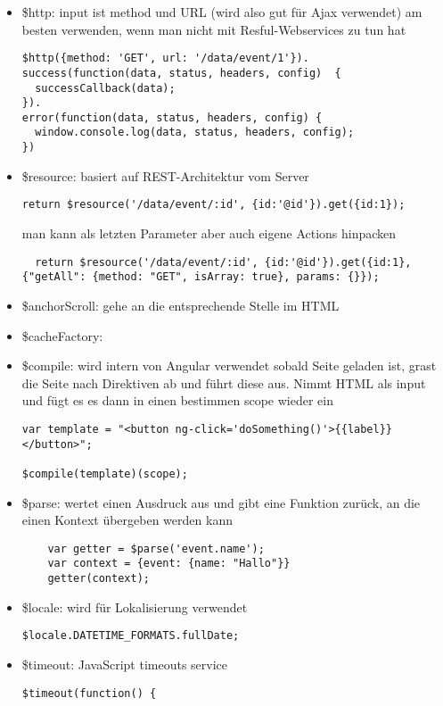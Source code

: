 \begin{itemize}
  \item \$http: input ist method und URL (wird also gut für Ajax verwendet) am besten verwenden,
    wenn man nicht mit Resful-Webservices zu tun hat
    \begin{verbatim}
$http({method: 'GET', url: '/data/event/1'}).
success(function(data, status, headers, config)  {
  successCallback(data);
}).
error(function(data, status, headers, config) {
  window.console.log(data, status, headers, config);
})
    \end{verbatim}
  \item \$resource: basiert auf REST-Architektur vom Server
  \begin{verbatim}
return $resource('/data/event/:id', {id:'@id'}).get({id:1});
  \end{verbatim}
    man kann als letzten Parameter aber auch eigene Actions hinpacken
  \begin{verbatim}
  return $resource('/data/event/:id', {id:'@id'}).get({id:1}, {"getAll": {method: "GET", isArray: true}, params: {}});
  \end{verbatim}
  \item \$anchorScroll: gehe an die entsprechende Stelle im HTML
  \item \$cacheFactory:
  \item \$compile: wird intern von Angular verwendet sobald Seite geladen ist, grast die Seite nach Direktiven ab und
    führt diese aus. Nimmt HTML als input und fügt es es dann in einen bestimmen scope wieder ein
    \begin{verbatim}
var template = "<button ng-click='doSomething()'>{{label}}</button>";

$compile(template)(scope);
    \end{verbatim}
  \item \$parse: wertet einen Ausdruck aus und gibt eine Funktion zurück, an die einen Kontext
    übergeben werden kann
    \begin{verbatim}
    var getter = $parse('event.name');
    var context = {event: {name: "Hallo"}}
    getter(context);
    \end{verbatim}
  \item \$locale: wird für Lokalisierung verwendet
    \begin{verbatim}
$locale.DATETIME_FORMATS.fullDate;
    \end{verbatim}

  \item \$timeout: JavaScript timeouts service
    \begin{verbatim}
$timeout(function() {


\end{verbatim}
\end{itemize}
